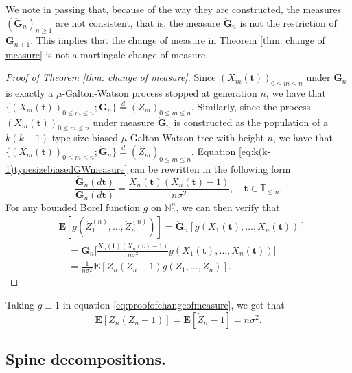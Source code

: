 \documentclass[12pt,a4paper]{amsart}
\numberwithin{equation}{section}
\begin{document}
	We note in passing that, because of the way they are constructed, the measures $(\ddot{\mathbf G}_n)_{n\ge 1}$ are not consistent, that is, the measure $\ddot{\mathbf G}_n$ is not the restriction of $\ddot{\mathbf G}_{n+1}$. 
	This implies that the change of measure in Theorem \ref{thm: change of measure} is not a martingale change of measure.
\medskip
\begin{proof}[Proof of Theorem \ref{thm: change of measure}]
	Since $(X_m( \mathbf t ))_{0\le m\le n}$ under ${\mathbf G}_n$ is exactly a $\mu$-Galton-Watson process stopped at generation $n$, we have that $\{(X_m( \mathbf t ))_{0\le m\le n}; {\mathbf G}_n\}  \overset{d}{=} (Z_m)_{0\le m\le n}.$
    Similarly, since the process $(X_m( \mathbf t ))_{0\le m\le n}$ under measure $\ddot{\mathbf G}_n$ is constructed as the population of a $k(k-1)$-type size-biased $\mu$-Galton-Watson tree with height $n$, we have that $\{(X_m( \mathbf t ))_{0\le m\le n};\ddot{\mathbf G}_n\}  \overset{d}{=} (\ddot Z_m)_{0\le m\le n}.$
	Equation \eqref{eq:k(k-1)typesizebiasedGWmeasure} can be rewritten in the following form
\begin{equation*}
    	\frac{\ddot{\mathbf G}_n(d \mathbf t )}{\mathbf G_n (d \mathbf t ) }
    =
    	\frac{X_n( \mathbf t )(X_n( \mathbf t )-1)}{n\sigma^2},
    \quad
    	 \mathbf t \in \mathbb T_{\leq n}.
\end{equation*}
    For any bounded Borel function $g$ on $\mathbb N_0^n$, we can then verify that
\begin{equation} \label{eq:proofofchangeofmeasure}
\begin{split}
	&\mathbf E [ g ( \ddot Z_1^{(n)}, \dots, \ddot Z_n^{(n)})]
	= \ddot{\mathbf G}_n [g ( X_1(  \mathbf t ), \dots, X_n(  \mathbf t ))]
    \\ &\quad = {\mathbf G}_n \big[ \frac { X_n( \mathbf t ) ( X_n( \mathbf t ) - 1)} {n \sigma^2} g (X_1( \mathbf t ), \dots, X_n( \mathbf t ))\big]
	\\&\quad = \frac { 1} { n \sigma^2} \mathbf E[ Z_n ( Z_n - 1) g( Z_1, \dots, Z_n)].
\end{split}
\end{equation}
\end{proof}
	Taking $g\equiv 1$ in equation \eqref{eq:proofofchangeofmeasure}, we get that %
\begin{equation}
	\label{eq: second moment}
	\mathbf E [Z_n(Z_n-1)]= \mathbf E [\dot Z_n - 1]= n\sigma^2.
\end{equation}
\subsection{Spine decompositions.}
\label{sec:spinesdecomposition}
\end{document}
